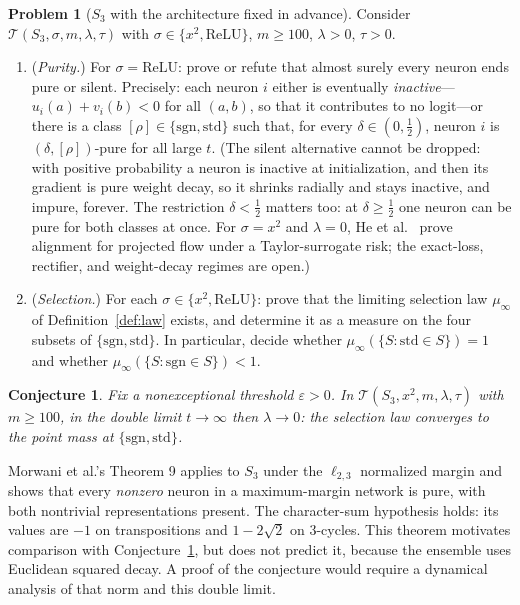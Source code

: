 \documentclass[11pt]{amsart}
\theoremstyle{plain}
\newtheorem{conjecture}[theorem]{Conjecture}
\theoremstyle{definition}
\newtheorem{problem}[theorem]{Problem}
\begin{document}
\begin{problem}[$S_3$ with the architecture fixed in advance]\label{prob:s3}
Consider $\mathcal{T}(S_3, \sigma, m, \lambda, \tau)$ with $\sigma \in \{x^2, \mathrm{ReLU}\}$, $m \geq 100$, $\lambda > 0$, $\tau > 0$.
\begin{enumerate}
\item[(a)] (\emph{Purity.}) For $\sigma = \mathrm{ReLU}$: prove or refute that almost surely every neuron ends pure or silent. Precisely: each neuron $i$ either is eventually \emph{inactive}---$u_i(a) + v_i(b) < 0$ for all $(a,b)$, so that it contributes to no logit---or there is a class $[\rho] \in \{\mathrm{sgn}, \mathrm{std}\}$ such that, for every $\delta \in (0,\tfrac12)$, neuron $i$ is $(\delta,[\rho])$-pure for all large $t$. (The silent alternative cannot be dropped: with positive probability a neuron is inactive at initialization, and then its gradient is pure weight decay, so it shrinks radially and stays inactive, and impure, forever. The restriction $\delta < \tfrac12$ matters too: at $\delta \geq \tfrac12$ one neuron can be pure for both classes at once. For $\sigma=x^2$ and $\lambda=0$, He et al.~\cite{he2026spectral} prove alignment for projected flow under a Taylor-surrogate risk; the exact-loss, rectifier, and weight-decay regimes are open.)
\item[(b)] (\emph{Selection.}) For each $\sigma \in \{x^2, \mathrm{ReLU}\}$: prove that the limiting selection law $\mu_\infty$ of Definition~\ref{def:law} exists, and determine it as a measure on the four subsets of $\{\mathrm{sgn}, \mathrm{std}\}$. In particular, decide whether $\mu_\infty(\{S : \mathrm{std} \in S\}) = 1$ and whether $\mu_\infty(\{S : \mathrm{sgn} \in S\}) < 1$.
\end{enumerate}
\end{problem}

\begin{conjecture}\label{conj:s3}
Fix a nonexceptional threshold $\varepsilon>0$. In $\mathcal{T}(S_3, x^2, m, \lambda, \tau)$ with $m \geq 100$, in the double limit $t \to \infty$ then $\lambda \to 0$: the selection law converges to the point mass at $\{\mathrm{sgn}, \mathrm{std}\}$.
\end{conjecture}

Morwani et al.'s Theorem 9 \cite{morwani2024} applies to $S_3$ under the $\ell_{2,3}$ normalized margin and shows that every \emph{nonzero} neuron in a maximum-margin network is pure, with both nontrivial representations present. The character-sum hypothesis holds: its values are $-1$ on transpositions and $1-2\sqrt2$ on $3$-cycles. This theorem motivates comparison with Conjecture~\ref{conj:s3}, but does not predict it, because the ensemble uses Euclidean squared decay. A proof of the conjecture would require a dynamical analysis of that norm and this double limit.
\end{document}
